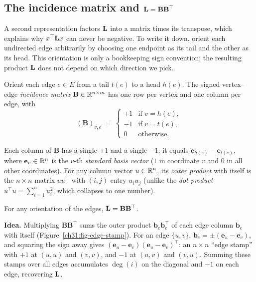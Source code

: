 \subsection{The incidence matrix and \texorpdfstring{$\mathbf{L} = \mathbf{B} \mathbf{B}^\top$}{L = B B\^T}}

A second representation factors $\mathbf{L}$ into a matrix times its transpose, which explains why $x^\top \mathbf{L} x$ can never be negative. To write it down, orient each undirected edge arbitrarily by choosing one endpoint as its tail and the other as its head. This orientation is only a bookkeeping sign convention; the resulting product $\mathbf{L}$ does not depend on which direction we pick.

\begin{definition}\label{ch31:def-incidence}
Orient each edge $e\in E$ from a tail $t(e)$ to a head $h(e)$. The signed vertex--edge \emph{incidence matrix} $\mathbf{B} \in \mathbb{R}^{n\times m}$ has one row per vertex and one column per edge, with
\[
  (\mathbf{B})_{v,e} \;=\;
  \begin{cases}
    +1 & \text{if } v = h(e),\\
    -1 & \text{if } v = t(e),\\
     0 & \text{otherwise.}
  \end{cases}
\]
\end{definition}

Each column of $\mathbf{B}$ has a single $+1$ and a single $-1$: it equals $\mathbf{e}_{h(e)} - \mathbf{e}_{t(e)}$, where $\mathbf{e}_v \in \mathbb{R}^n$ is the $v$-th \emph{standard basis vector} ($1$ in coordinate $v$ and $0$ in all other coordinates). For any column vector $u \in \mathbb{R}^n$, its \emph{outer product} with itself is the $n\times n$ matrix $u u^\top$ with $(i,j)$ entry $u_i u_j$ (unlike the \emph{dot product} $u^\top u = \sum_{i=1}^n u_i^2$, which collapses to one number).

\begin{theorem}\label{ch31:thm-bbt}
For any orientation of the edges, $\mathbf{L} = \mathbf{B} \mathbf{B}^\top$.
\end{theorem}

\begin{whybox}
\textbf{Idea.} Multiplying $\mathbf{B}\mathbf{B}^\top$ sums the outer product $\mathbf{b}_e \mathbf{b}_e^\top$ of each edge column $\mathbf{b}_e$ with itself (Figure~\ref{ch31:fig-edge-stamp}). For an edge $\{u,v\}$, $\mathbf{b}_e = \pm(\mathbf{e}_u - \mathbf{e}_v)$, and squaring the sign away gives $(\mathbf{e}_u-\mathbf{e}_v)(\mathbf{e}_u-\mathbf{e}_v)^\top$: an $n\times n$ ``edge stamp'' with $+1$ at $(u,u)$ and $(v,v)$, and $-1$ at $(u,v)$ and $(v,u)$. Summing these stamps over all edges accumulates $\deg(i)$ on the diagonal and $-1$ on each edge, recovering $\mathbf{L}$.
\end{whybox}

